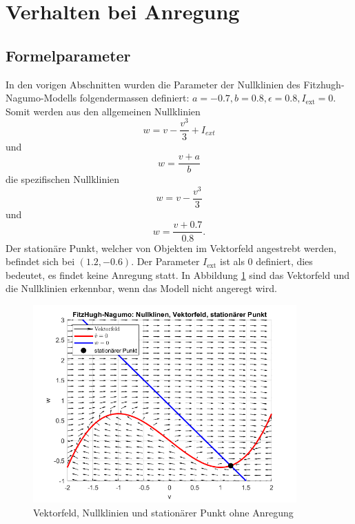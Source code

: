 \section{Verhalten bei Anregung}
\subsection{Formelparameter}
In den vorigen Abschnitten wurden die Parameter der Nullklinien des Fitzhugh-Nagumo-Modells folgendermassen definiert:
\(a = -0.7, b = 0.8, \epsilon = 0.8, I_\text{ext} = 0\). Somit werden aus den allgemeinen Nullklinien \[ w = v - \frac{v^3}{3} + I_{ext}\]
und \[w = \frac{v + a}{b}\] die spezifischen Nullklinien \[ w = v - \frac{v^3}{3}\]
und \[w = \frac{v + 0.7}{0.8}.\]
Der stationäre Punkt, welcher von Objekten im Vektorfeld angestrebt werden, befindet sich bei $(1.2 ,-0.6)$.
Der Parameter $I_\text{ext}$ ist als 0 definiert, dies bedeutet, es findet keine Anregung statt.
In Abbildung \ref{fig:Parameter} sind das Vektorfeld und die Nullklinien erkennbar, wenn das Modell nicht angeregt wird.
\begin{figure}
    \centering
    \includegraphics[width=0.9\textwidth]{papers/nerven/Bilder/Anregung1.png}
    \caption{Vektorfeld, Nullklinien und stationärer Punkt ohne Anregung}
    \label{fig:Parameter}
\end{figure}
